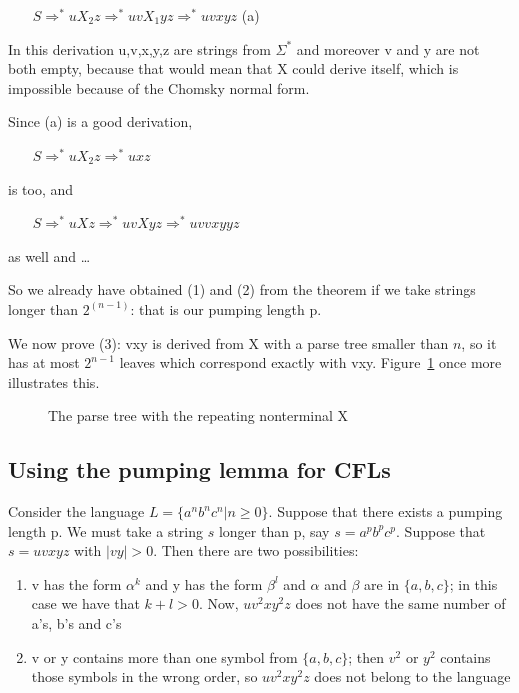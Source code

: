 $~~~~~~~~S \Rightarrow^* uX_2z \Rightarrow^* uvX_1yz \Rightarrow^* uvxyz$ (a)

In this derivation u,v,x,y,z are strings from $\Sigma^*$ and moreover
v and y are not both empty, because that would mean that X could
derive itself, which is impossible because of the Chomsky normal form.

Since (a) is a good derivation,


$~~~~~~~~S \Rightarrow^* uX_2z \Rightarrow^* uxz$

is too, and



$~~~~~~~~S \Rightarrow^* uXz \Rightarrow^* uvXyz \Rightarrow^* uvvxyyz$


as well and \ldots

So we already have obtained (1) and (2) from the theorem if we take strings longer than $2^{(n-1)}$: that is our pumping length p.


We now prove (3): vxy is derived from X with a parse tree smaller than
$n$, so it has at most $2^{n-1}$ leaves which correspond exactly with
vxy. Figure~\ref{parsetree2} once more illustrates this.
\prend
\begin{figure}[h]
\caption{The parse tree with the repeating nonterminal
  X \label{parsetree2}}
\end{figure}


\subsection{Using the pumping lemma for CFLs}\label{voorbeeldpompcfl}

Consider the language $L = \{a^nb^nc^n | n \geq 0\}$. Suppose that
there exists a pumping length p. We must take a string $s$ longer than
p, say $s = a^pb^pc^p$.  Suppose that $s = uvxyz$ with $|vy| >
0$. Then there are two possibilities:
\begin{enumerate}
\item
v has the form $\alpha^k$ and y has the form $\beta^l$ and
$\alpha$ and $\beta$ are in $\{a,b,c\}$; in this case we have that
$k+l > 0$. Now, $uv^2xy^2z$ does not have the same number of a's, b's
and c's

\item
v or y contains more than one symbol from $\{a,b,c\}$; then $v^2$ or
$y^2$ contains those symbols in the wrong order, so $uv^2xy^2z$ does not belong to the language

\end{enumerate}


